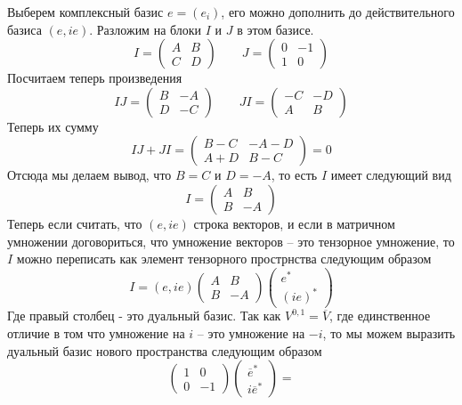 \documentclass{article}
\begin{document}
\begin{enumerate}
        Выберем комплексный базис $e=(e_i)$, его можно дополнить до действительного
        базиса $(e,ie)$. Разложим на блоки $I$ и $J$ в этом базисе.
        \[I=\left(\begin{array}{cc}A&B\\C&D\end{array}\right)\quad\quad J=\left(\begin{array}{cc}0&-1\\1&0\end{array}\right)\]
        Посчитаем теперь произведения
        \[IJ=\left(\begin{array}{cc}B&-A\\D&-C\end{array}\right)\quad\quad JI=\left(\begin{array}{cc}-C&-D\\A&B\end{array}\right)\]
        Теперь их сумму
        \[IJ+JI=\left(\begin{array}{cc}B-C&-A-D\\A+D&B-C\end{array}\right)=0\]
        Отсюда мы делаем вывод, что $B=C$ и $D=-A$, то есть $I$ имеет следующий
        вид
        \[I=\left(\begin{array}{cc}A&B\\B&-A\end{array}\right)\]
        Теперь если считать, что $(e,ie)$ строка векторов, и если в матричном
        умножении договориться, что умножение векторов – это тензорное умножение,
        то $I$ можно переписать как элемент тензорного прострнства следующим образом
        \[I=(e,ie)\left(\begin{array}{cc}A&B\\B&-A\end{array}\right)\left(\begin{array}{c}e^*\\(ie)^*\end{array}\right)\]
        Где правый столбец - это дуальный базис. Так как $V^{0,1}=\overline V$,
        где единственное отличие в том что умножение на $i$ – это умножение на
        $-i$, то мы можем выразить дуальный базис нового пространства следующим
        образом
        \[\left(\begin{array}{cc}1&0\\0&-1\end{array}\right)
        \left(\begin{array}{c}\overline e^*\\i\overline e^*\end{array}\right)=
\]
\end{enumerate}
\end{document}
